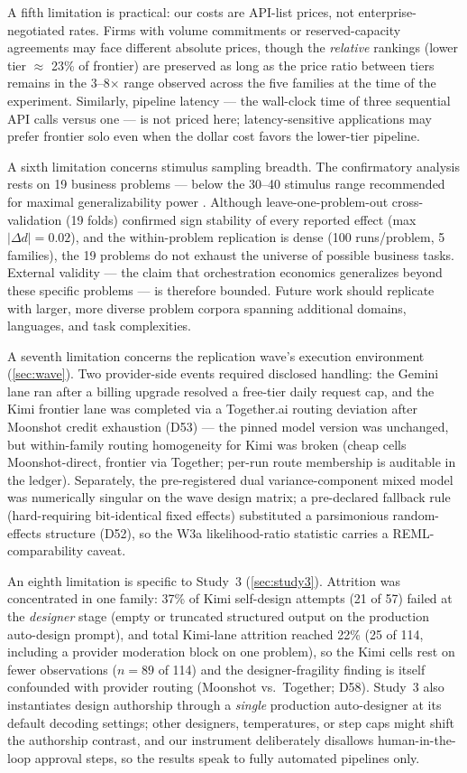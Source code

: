 \documentclass[12pt,a4paper]{article}
\begin{document}
A fifth limitation is practical: our costs are API-list prices, not
enterprise-negotiated rates. Firms with volume commitments or reserved-capacity
agreements may face different absolute prices, though the \emph{relative}
rankings (lower tier $\approx$ 23\% of frontier) are preserved as long as the
price ratio between tiers remains in the 3--8$\times$ range observed across the
five families at the time of the experiment. Similarly, pipeline latency --- the
wall-clock time of three sequential API calls versus one --- is not priced here;
latency-sensitive applications may prefer frontier solo even when the dollar
cost favors the lower-tier pipeline.

A sixth limitation concerns stimulus sampling breadth. The confirmatory
analysis rests on 19 business problems --- below the 30--40 stimulus range
recommended for maximal generalizability power \citep{WestfallKennyJudd2014}.
Although leave-one-problem-out cross-validation (19 folds)
confirmed sign stability of every reported effect (max $|\Delta d| = 0.02$),
and the within-problem replication is dense (100 runs/problem, 5
families), the 19 problems do not exhaust the universe of possible
business tasks. External validity --- the claim that orchestration
economics generalizes beyond these specific problems --- is therefore
bounded. Future work should replicate with larger, more diverse problem
corpora spanning additional domains, languages, and task complexities.

A seventh limitation concerns the replication wave's execution environment
(\cref{sec:wave}). Two provider-side events required disclosed handling: the
Gemini lane ran after a billing upgrade resolved a free-tier daily request
cap, and the Kimi frontier lane was completed via a Together.ai routing
deviation after Moonshot credit exhaustion (D53) --- the pinned model version
was unchanged, but within-family routing homogeneity for Kimi was broken
(cheap cells Moonshot-direct, frontier via Together; per-run route membership
is auditable in the ledger). Separately, the pre-registered dual
variance-component mixed model was numerically singular on the wave design
matrix; a pre-declared fallback rule (hard-requiring bit-identical fixed
effects) substituted a parsimonious random-effects structure (D52), so the
W3a likelihood-ratio statistic carries a REML-comparability caveat.

An eighth limitation is specific to Study~3 (\cref{sec:study3}). Attrition was concentrated in one family: 37\% of Kimi self-design
attempts (21 of 57) failed at the \emph{designer} stage (empty or
truncated structured output on the production auto-design prompt), and
total Kimi-lane attrition reached 22\% (25 of 114, including a provider
moderation block on one problem), so the Kimi cells rest on fewer
observations ($n = 89$ of 114) and the designer-fragility finding is
itself confounded with provider routing (Moonshot vs.\ Together; D58). Study~3
also instantiates design authorship through a \emph{single} production
auto-designer at its default decoding settings; other designers, temperatures,
or step caps might shift the authorship contrast, and our instrument
deliberately disallows human-in-the-loop approval steps, so the results speak
to fully automated pipelines only.
\end{document}
